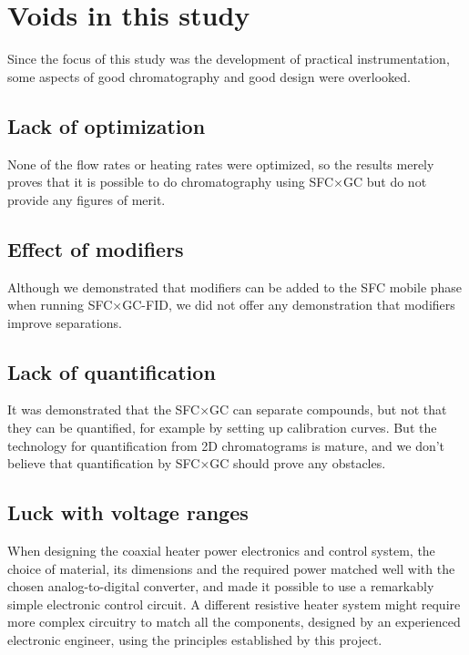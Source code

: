 \section{Voids in this study} 

Since the focus of this study was the development of practical instrumentation,
some aspects of good chromatography and good design were overlooked.

\subsection{Lack of optimization}

None of the flow rates or heating rates were optimized, so the results merely
proves that it is possible to do chromatography using SFC×GC but do not
provide any figures of merit.

\subsection{Effect of modifiers}

Although we demonstrated that modifiers can be added to the SFC mobile phase
when running SFC×GC-FID, we did not offer any demonstration that modifiers
improve separations.

\subsection{Lack of quantification}

It was demonstrated that the SFC×GC can separate compounds, but not that they
can be quantified, for example by setting up calibration curves. But the
technology for quantification from 2D chromatograms is mature, and we don't
believe that quantification by SFC×GC should prove any obstacles.

\subsection{Luck with voltage ranges}

When designing the coaxial heater power electronics and control system, the
choice of material, its dimensions and the required power matched well with the
chosen analog-to-digital converter, and made it possible to use a remarkably
simple electronic control circuit. A different resistive heater system might
require more complex circuitry to match all the components, designed by an
experienced electronic engineer, using the principles established by this
project.

